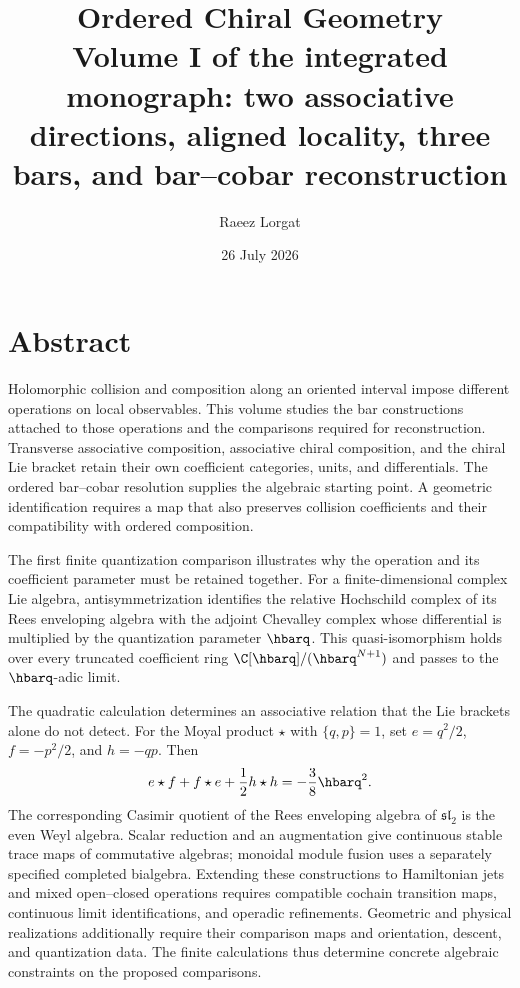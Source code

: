 \documentclass[11pt,twoside,openright]{memoir}
\title{\texorpdfstring{\textbf{Ordered Chiral Geometry}\\[0.55em]\Large Volume I of the integrated monograph: two associative directions, aligned locality, three bars, and bar--cobar reconstruction}{Ordered Chiral Geometry: Volume I of the integrated monograph: two associative directions, aligned locality, three bars, and bar--cobar reconstruction}}
\author{Raeez Lorgat}
\date{26 July 2026}
\begin{document}
\frontmatter
\maketitle
\thispagestyle{empty}
\cleardoublepage
\chapter*{Abstract}

Holomorphic collision and composition along an oriented interval impose different operations on local observables. This volume studies the bar constructions attached to those operations and the comparisons required for reconstruction. Transverse associative composition, associative chiral composition, and the chiral Lie bracket retain their own coefficient categories, units, and differentials. The ordered bar--cobar resolution supplies the algebraic starting point. A geometric identification requires a map that also preserves collision coefficients and their compatibility with ordered composition.

The first finite quantization comparison illustrates why the operation and its coefficient parameter must be retained together. For a finite-dimensional complex Lie algebra, antisymmetrization identifies the relative Hochschild complex of its Rees enveloping algebra with the adjoint Chevalley complex whose differential is multiplied by the quantization parameter $\hbarq$. This quasi-isomorphism holds over every truncated coefficient ring $\C[\hbarq]/(\hbarq^{N+1})$ and passes to the $\hbarq$-adic limit.

The quadratic calculation determines an associative relation that the Lie brackets alone do not detect. For the Moyal product $\star$ with $\{q,p\}=1$, set $e=q^2/2$, $f=-p^2/2$, and $h=-qp$. Then
\[
 e\star f+f\star e+\frac12h\star h=-\frac38\hbarq^2.
\]
The corresponding Casimir quotient of the Rees enveloping algebra of $\mathfrak{sl}_2$ is the even Weyl algebra. Scalar reduction and an augmentation give continuous stable trace maps of commutative algebras; monoidal module fusion uses a separately specified completed bialgebra. Extending these constructions to Hamiltonian jets and mixed open--closed operations requires compatible cochain transition maps, continuous limit identifications, and operadic refinements. Geometric and physical realizations additionally require their comparison maps and orientation, descent, and quantization data. The finite calculations thus determine concrete algebraic constraints on the proposed comparisons.
\end{document}
